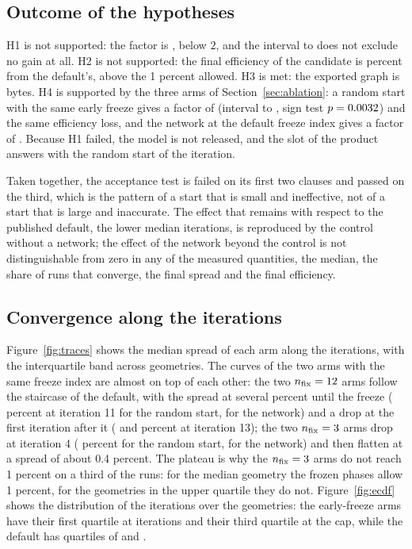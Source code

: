 \subsection{Outcome of the hypotheses}\label{sec:res-hyp}

H1 is not supported: the factor is \ratioRoverN{}, below $2$, and the interval \ratioRoverNLo{} to \ratioRoverNHi{} does not exclude no gain at all. H2 is not supported: the final efficiency of the candidate is \effdNThree{} percent from the default's, above the 1 percent allowed. H3 is met: the exported graph is \onnxBytes{} bytes. H4 is supported by the three arms of Section~\ref{sec:ablation}: a random start with the same early freeze gives a factor of \ratioRoverRThree{} (interval \ratioRoverRThreeLo{} to
\ratioRoverRThreeHi, sign test $p=0.0032$) and the same efficiency loss, and the network at the default freeze index gives a factor of \ratioRoverNTwelve{}. Because H1 failed, the model is not released, and the slot of the product answers with the random start of the iteration.

Taken together, the acceptance test is failed on its first two clauses and passed on the third, which is the pattern of a start that is small and ineffective, not of a start that is large and inaccurate. The effect that remains with respect to the published default, the lower median iterations, is reproduced by the control without a network; the effect of the network beyond the control is not distinguishable from zero in any of the measured quantities, the median, the share of runs that converge, the final spread and the final efficiency.

\subsection{Convergence along the iterations}\label{sec:res-traces}

Figure~\ref{fig:traces} shows the median spread of each arm along the iterations, with the interquartile band across geometries. The curves of the two arms with the same freeze index are almost on top of each other: the two $n_{\mathrm{fix}}=12$ arms follow the staircase of the default, with the spread at several percent until the freeze (\trRTwelveEleven{} percent at iteration 11 for the random start, \trNTwelveEleven{} for the network) and a drop at the first iteration after it
(\trRTwelveThirteen{} and \trNTwelveThirteen{} percent at iteration 13); the two $n_{\mathrm{fix}}=3$ arms drop at iteration 4 (\trRThreeFour{} percent for the random start, \trNThreeFour{} for the network) and then flatten at a spread of about 0.4 percent. The plateau is why the $n_{\mathrm{fix}}=3$ arms do not reach 1 percent on a third of the runs: for the median geometry the frozen phases allow 1 percent, for the geometries in the upper quartile they do not. Figure~\ref{fig:ecdf} shows the distribution of the iterations
over the geometries: the early-freeze arms have their first quartile at \itRThreeQa{} iterations and their third quartile at the cap, while the default has quartiles of \itRTwelveQa{} and \itRTwelveQb{}.

